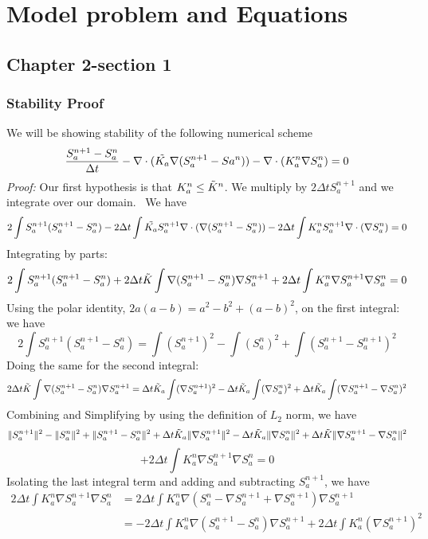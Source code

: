 \chapter{Model problem and Equations}
\label{sec:chapter2}

\minitoc 


	\section{Chapter 2-section 1}
\label{sec:chapter_1_sec_1}


\subsection{Stability Proof}


We will be showing stability of the following numerical scheme
\[
\frac{S_{a}^{n+1}- S_{a}^{n}}{\Delta t} - 
\nabla \cdot (\Tilde{K_a}\nabla(S_{a}^{n+1}-Sa^{n})) 
- \nabla \cdot ( K_{a}^{n} \nabla S_{a}^{n}) = 0
\]
\textit{Proof:}
Our first hypothesis is that $K_a^{n} \leq \Tilde{K}^{n}$.
We multiply by  $2\Delta t S_{a}^{n+1}$ and we integrate over our domain. \
We have
\[
2 \int S_{a}^{n+1}(S_{a}^{n+1} - S_{a}^{n}) - 
2 \Delta t \int  \Tilde{K_{a}} S_{a}^{n+1} 
\nabla \cdot(\nabla(S_{a}^{n+1}-S_{a}^{n}))
- 2 \Delta t \int K_a^n S_a^{n+1} \nabla \cdot (\nabla S_a^n)= 0
\]
Integrating by parts:
\[
2 \int S_{a}^{n+1}(S_{a}^{n+1} - S_{a}^{n}) 
+ 2 \Delta t \Tilde{K} \int \nabla(S_{a}^{n+1} 
- S_{a}^{n}) \nabla S_{a}^{n+1} + 2 \Delta t \int K_a^{n} 
\nabla S_a^{n+1} \nabla S_a^{n} = 0         
\]
Using the polar identity, $2a(a-b) = a^2 - b^2 +(a-b)^2$, on the first integral:
we have
\[
2 \int S_a^{n+1} (S_a^{n+1}-S_a^{n}) = 
\int (S_a^{n+1})^2 - \int (S_a^{n})^2 + \int (S_a^{n+1} - S_a^{n+1})^2
\]
Doing the same for the second integral:
\[
2 \Delta t \Tilde{K} \int \nabla(S_{a}^{n+1} 
- S_{a}^{n}) \nabla S_{a}^{n+1} =  \Delta t \Tilde{K}_a \int (\nabla S_a^{n+1})^2 -
\Delta t \Tilde{K}_a \int (\nabla S_a^{n})^2 + \Delta t \Tilde{K}_a 
\int (\nabla S_a^{n+1} - \nabla S_a^{n})^2
\]
Combining and Simplifying by using the definition of  $L_2$ norm, we have
\[
\| S_a^{n+1} \|^2-\| S_a^{n} \|^2 + \| S_a^{n+1} - S_a^{n} \|^2+
\Delta t \Tilde{K}_a \|\nabla S_a^{n+1} \|^2-   \Delta t
\Tilde{K}_a \| \nabla S_a^{n} \|^2 + \Delta t \Tilde{K} \|
\nabla S_a^{n+1} - \nabla S_a^{n} \|^2
\]
\[
+ 2 \Delta t \int K_a^{n} \nabla S_a^{n+1} \nabla S_a^{n} = 0
\]
Isolating the last integral term and adding and subtracting $ S_a^{n+1}$, we
have 
\begin{align*}
	2 \Delta t \int K_a^{n} \nabla S_a^{n+1} \nabla S_a^{n}  &= 2 \Delta t
	\int K_a^{n} \nabla( S_a^n - \nabla S_a^{n+1} +\nabla S_a^{n+1}) \nabla
	S_a^{n+1} \\
	&=  -2 \Delta t \int K_a^n \nabla(S_a^{n+1} - S_a^n)\nabla
	S_a^{n+1} + 2 \Delta t \int K_a^n (\nabla S_a^{n+1})^2
\end{align*}
